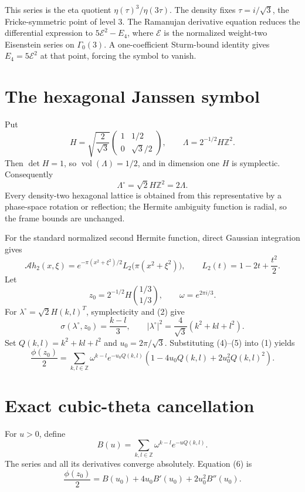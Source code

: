 \documentclass[11pt]{article}
\newcommand{\Z}{\mathbb Z}
\newcommand{\cA}{\mathcal A}
\begin{document}
This series is the eta quotient \(\eta(\tau)^3/\eta(3\tau)\).  The density
fixes \(\tau=i/\sqrt3\), the Fricke-symmetric point of level \(3\).  The
Ramanujan derivative equation reduces the differential expression to
\(5\mathcal E^2-E_4\), where \(\mathcal E\) is the normalized weight-two
Eisenstein series on \(\Gamma_0(3)\).  A one-coefficient Sturm-bound
identity gives \(E_4=5\mathcal E^2\) at that point, forcing the symbol to
vanish.

\section{The hexagonal Janssen symbol}

Put
\[
 H=\sqrt{\frac2{\sqrt3}}
 \begin{pmatrix}1&1/2\\0&\sqrt3/2\end{pmatrix},
 \qquad
 \Lambda=2^{-1/2}H\Z^2.                                 \tag{2}
\]
Then \(\det H=1\), so \(\operatorname{vol}(\Lambda)=1/2\), and in
dimension one \(H\) is symplectic.  Consequently
\[
 \Lambda^\circ=\sqrt2H\Z^2=2\Lambda.                    \tag{3}
\]
Every density-two hexagonal lattice is obtained from this representative by
a phase-space rotation or reflection; the Hermite ambiguity function is
radial, so the frame bounds are unchanged.

For the standard normalized second Hermite function, direct Gaussian
integration gives
\[
 \cA h_2(x,\xi)=e^{-\pi(x^2+\xi^2)/2}
 L_2\bigl(\pi(x^2+\xi^2)\bigr),
 \qquad L_2(t)=1-2t+\frac{t^2}{2}.                        \tag{4}
\]
Let
\[
 z_0=2^{-1/2}H\binom{1/3}{1/3},
 \qquad \omega=e^{2\pi i/3}.
\]
For \(\lambda^\circ=\sqrt2H(k,l)^T\), symplecticity and (2) give
\[
 \sigma(\lambda^\circ,z_0)=\frac{k-l}{3},
 \qquad
 |\lambda^\circ|^2=\frac4{\sqrt3}(k^2+kl+l^2).          \tag{5}
\]
Set \(Q(k,l)=k^2+kl+l^2\) and \(u_0=2\pi/\sqrt3\).  Substituting
(4)--(5) into (1) yields
\[
 \frac{\phi(z_0)}2=
 \sum_{k,l\in\Z}\omega^{k-l}e^{-u_0Q(k,l)}
 \left(1-4u_0Q(k,l)+2u_0^2Q(k,l)^2\right).              \tag{6}
\]

\section{Exact cubic-theta cancellation}

For \(u>0\), define
\[
 B(u)=\sum_{k,l\in\Z}\omega^{k-l}e^{-uQ(k,l)}.
\]
The series and all its derivatives converge absolutely.  Equation (6) is
\[
 \frac{\phi(z_0)}2=B(u_0)+4u_0B'(u_0)+2u_0^2B''(u_0).    \tag{7}
\]
\end{document}
